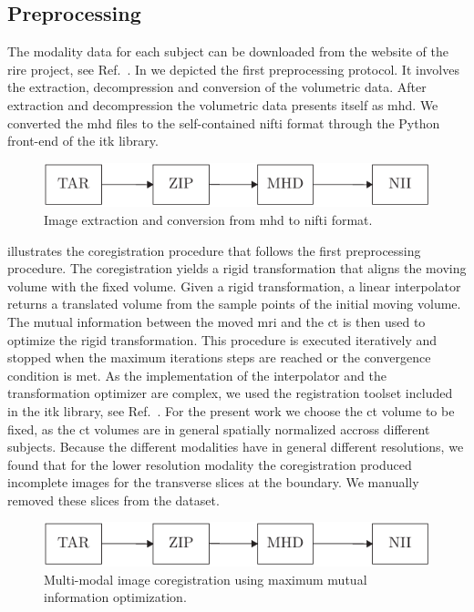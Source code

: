 \subsection{Preprocessing}

The modality data for each subject can be downloaded from the website of the
\gls{rire} project, see Ref.~\cite{RIRE}. In  we depicted
the first preprocessing protocol. It involves the extraction, decompression and
conversion of the volumetric data. After extraction and decompression the
volumetric data presents itself as \gls{mhd}. We converted the \gls{mhd} files
to the self-contained \gls{nifti} format through the Python front-end of the
\gls{itk} library.
\begin{figure}[h]
  \centering
  \includegraphics[page=1,width=.8\linewidth]{figure/diagrams.pdf}
  \caption{Image extraction and conversion from \gls{mhd} to \gls{nifti}
		format.
	}\label{fig:conversion}
\end{figure}
 illustrates the coregistration procedure that follows
the first preprocessing procedure. The coregistration yields a rigid
transformation that aligns the moving volume with the fixed volume. Given a
rigid transformation, a linear interpolator returns a translated volume from
the sample points of the initial moving volume. The mutual information between
the moved \gls{mri} and the \gls{ct} is then used to optimize the
rigid transformation. This procedure is executed iteratively and stopped when
the maximum iterations steps are reached or the convergence condition is met.
As the implementation of the interpolator and the transformation optimizer
are complex, we used the registration toolset included in the \gls{itk}
library, see Ref.~\cite{Yaniv2018}.
For the present work we choose the \gls{ct} volume to be fixed, as the
\gls{ct} volumes are in general spatially normalized accross different
subjects. Because the different modalities have in general different
resolutions, we found that for the lower resolution modality the
coregistration produced incomplete images for the transverse slices at the
boundary. We manually removed these slices from the dataset.
\begin{figure}[h]
  \centering
  \includegraphics[page=2,width=.8\linewidth]{figure/diagrams.pdf}
  \caption{Multi-modal image coregistration using maximum mutual information
    optimization.
	}\label{fig:registration}
\end{figure}
